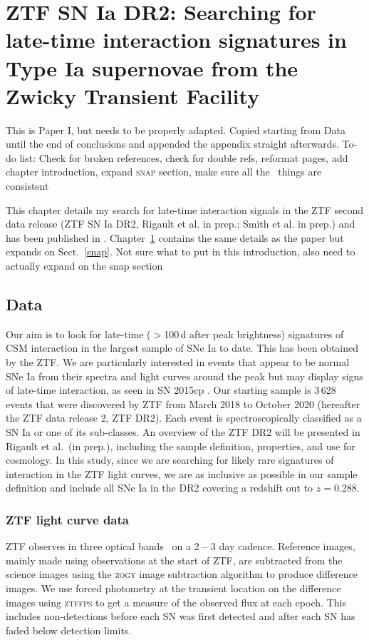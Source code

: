 \documentclass[a4paper,oneside,12pt, class=Latex/Classes/PhDthesisPSnPDF, crop=false]{standalone}
\begin{document}
\doublespacing
\chapter{ZTF SN Ia DR2: Searching for late-time interaction signatures in Type Ia supernovae from the Zwicky Transient Facility}
\label{chap:DR2_search}


\color{red} This is Paper I, but needs to be properly adapted. Copied starting from Data until the end of conclusions and appended the appendix straight afterwards. To-do list: Check for broken references, check for double refs, reformat pages, add chapter introduction, expand \textsc{snap} section, make sure all the \ztfg\ztfr\ztfi\ things are consistent\color{black}

This chapter details my search for late-time interaction signals in the ZTF second data release (ZTF SN Ia DR2, Rigault et al. in prep.; Smith et al. in prep.) and has been published in \cite{Terwel_2024_paper1}. Chapter~\ref{chap:DR2_search} contains the same details as the paper but expands on Sect.~\ref{snap}. \color{red} Not sure what to put in this introduction, also need to actually expand on the snap section \color{black}


\section{Data}
\label{data}
Our aim is to look for late-time ($>$100\,d after peak brightness) signatures of CSM interaction in the largest sample of SNe Ia to date. This has been obtained by the ZTF. We are particularly interested in events that appear to be normal SNe Ia from their spectra and light curves around the peak but may display signs of late-time interaction, as seen in SN 2015cp \citep{2015cp}. Our starting sample is 3\,628 events that were discovered by ZTF from March 2018 to October 2020 (hereafter the ZTF data release 2, ZTF DR2). Each event is spectroscopically classified as a SN Ia or one of its sub-classes. An overview of the ZTF DR2 will be presented in Rigault et al.~(in prep.), including the sample definition, properties, and use for cosmology. In this study, since we are searching for likely rare signatures of interaction in the ZTF light curves, we are as inclusive as possible in our sample definition and include all SNe Ia in the DR2 covering a redshift out to $z = 0.288$. 

\subsection{ZTF light curve data}
\label{lc_data}
ZTF observes in three optical bands \ztfg\ztfr\ztfi\ on a 2 -- 3 day cadence. Reference images, mainly made using observations at the start of ZTF, are subtracted from the science images using the \textsc{zogy} image subtraction algorithm \citep{ZOGY} to produce difference images. We use forced photometry at the transient location on the difference images using \textsc{ztffps} \citep{ztffps} to get a measure of the observed flux at each epoch. This includes non-detections before each SN was first detected and after each SN has faded below detection limits. 
\end{document}
